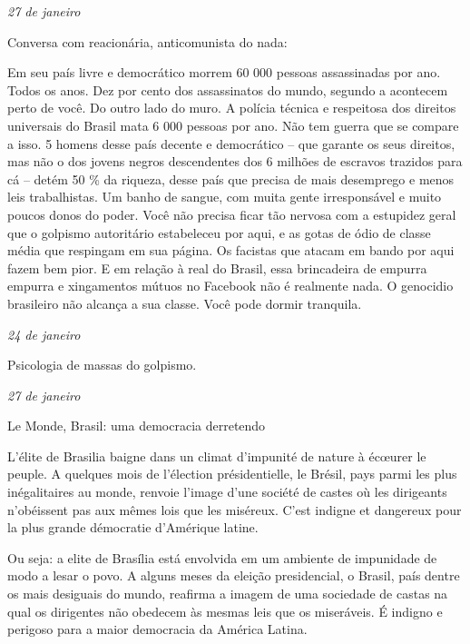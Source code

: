 \begin{flushright}
\emph{27 de janeiro}
\end{flushright}

Conversa com reacionária, anticomunista do nada:

Em seu país livre e democrático morrem 60 000 pessoas assassinadas por
ano. Todos os anos. Dez por cento dos assassinatos do mundo, segundo a
 acontecem perto de você. Do outro lado do muro. A polícia técnica e
respeitosa dos direitos universais do Brasil mata 6 000 pessoas por ano.
Não tem guerra que se compare a isso. 5 homens desse país decente e
democrático -- que garante os seus direitos, mas não o dos jovens negros
descendentes dos 6 milhões de escravos trazidos para cá -- detém 50 \% da
riqueza, desse país que precisa de mais desemprego e menos leis
trabalhistas. Um banho de sangue, com muita gente irresponsável e muito
poucos donos do poder. Você não precisa ficar tão nervosa com a
estupidez geral que o golpismo autoritário estabeleceu por aqui, e as
gotas de ódio de classe média que respingam em sua página. Os facistas
que atacam em bando por aqui fazem bem pior. E em relação à real do
Brasil, essa brincadeira de empurra empurra e xingamentos mútuos no Facebook
não é realmente nada. O genocidio brasileiro não alcança a sua
classe. Você pode dormir tranquila.

\pagebreak

\begin{flushright}
\emph{24 de janeiro}
\end{flushright}

Psicologia de massas do golpismo.

\begin{flushright}
\emph{27 de janeiro}
\end{flushright}

Le Monde, Brasil: uma democracia derretendo

L'élite de Brasilia baigne dans un climat d'impunité de nature à écœurer
le peuple. A quelques mois de l'élection présidentielle, le Brésil, pays
parmi les plus inégalitaires au monde, renvoie l'image d'une société de
castes où les dirigeants n'obéissent pas aux mêmes lois que les
miséreux. C'est indigne et dangereux pour la plus grande démocratie
d'Amérique latine.

Ou seja: a elite de Brasília está envolvida em um ambiente de impunidade
de modo a lesar o povo. A alguns meses da eleição presidencial, o
Brasil, país dentre os mais desiguais do mundo, reafirma a imagem de uma
sociedade de castas na qual os dirigentes não obedecem às mesmas leis
que os miseráveis. É indigno e perigoso para a maior democracia da
América Latina.

